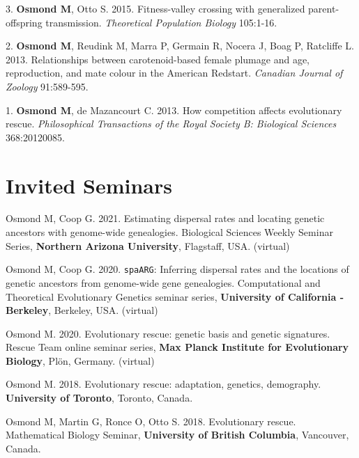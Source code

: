 \documentclass[12pt]{article}
\begin{document}
\noindent\hspace{.1cm}3. \textbf{Osmond M}, Otto S. 2015. Fitness-valley crossing with generalized parent-offspring transmission. \textit{Theoretical Population Biology} 105:1-16. %

\noindent\hspace{.1cm}2. \textbf{Osmond M}, Reudink M, Marra P, Germain R, Nocera J,  Boag P, Ratcliffe L.  2013. Relationships between carotenoid-based female plumage and age, reproduction, and mate colour in the American Redstart. \textit{Canadian Journal of Zoology} 91:589-595. %

\noindent\hspace{.1cm}1. \textbf{Osmond M}, de Mazancourt C. 2013. How competition affects evolutionary rescue. \textit{Philosophical Transactions of the Royal Society B: Biological Sciences} 368:20120085. %

\newpage
\section*{Invited Seminars}

Osmond M, Coop G. 2021. Estimating dispersal rates and locating genetic ancestors with genome-wide genealogies. Biological Sciences Weekly Seminar Series, \textbf{Northern Arizona University}, Flagstaff, USA. (virtual)

Osmond M, Coop G. 2020. \texttt{spaARG}: Inferring dispersal rates and the locations of genetic ancestors from genome-wide gene genealogies. Computational and Theoretical Evolutionary Genetics seminar series, \textbf{University of California - Berkeley}, Berkeley, USA. (virtual)

Osmond M. 2020. Evolutionary rescue: genetic basis and genetic signatures. Rescue Team online seminar series, \textbf{Max Planck Institute for Evolutionary Biology}, Pl\"{o}n, Germany. (virtual)

Osmond M. 2018. Evolutionary rescue: adaptation, genetics, demography. \textbf{University of Toronto}, Toronto, Canada.

Osmond M, Martin G, Ronce O, Otto S. 2018. Evolutionary rescue. Mathematical Biology Seminar, \textbf{University of British Columbia}, Vancouver, Canada.
\end{document}
